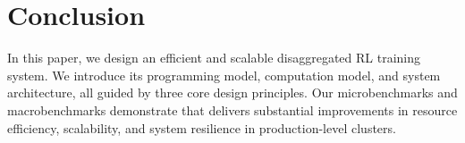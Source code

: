 

\section{Conclusion}
In this paper, we design an efficient and scalable disaggregated RL training system. We introduce its programming model, computation model, and system architecture, all guided by three core design principles. Our microbenchmarks and macrobenchmarks demonstrate that \SystemName{} delivers substantial improvements in resource efficiency, scalability, and system resilience in production-level clusters. 


